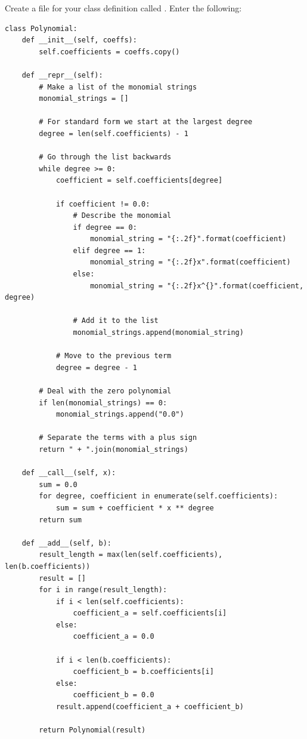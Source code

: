Create a file for your class definition called . Enter the following:
\begin{verbatim}
class Polynomial:
    def __init__(self, coeffs):
        self.coefficients = coeffs.copy()

    def __repr__(self):
        # Make a list of the monomial strings
        monomial_strings = []

        # For standard form we start at the largest degree
        degree = len(self.coefficients) - 1

        # Go through the list backwards
        while degree >= 0:
            coefficient = self.coefficients[degree]

            if coefficient != 0.0:
                # Describe the monomial
                if degree == 0:
                    monomial_string = "{:.2f}".format(coefficient)
                elif degree == 1:
                    monomial_string = "{:.2f}x".format(coefficient)
                else:
                    monomial_string = "{:.2f}x^{}".format(coefficient, degree)
                
                # Add it to the list
                monomial_strings.append(monomial_string)
        
            # Move to the previous term
            degree = degree - 1

        # Deal with the zero polynomial
        if len(monomial_strings) == 0:
            monomial_strings.append("0.0")
    
        # Separate the terms with a plus sign
        return " + ".join(monomial_strings)

    def __call__(self, x):
        sum = 0.0  
        for degree, coefficient in enumerate(self.coefficients):
            sum = sum + coefficient * x ** degree
        return sum

    def __add__(self, b):
        result_length = max(len(self.coefficients), len(b.coefficients))
        result = []
        for i in range(result_length):
            if i < len(self.coefficients):
                coefficient_a = self.coefficients[i]
            else:
                coefficient_a = 0.0

            if i < len(b.coefficients):
                coefficient_b = b.coefficients[i]
            else:
                coefficient_b = 0.0
            result.append(coefficient_a + coefficient_b)
            
        return Polynomial(result)


\end{verbatim}

